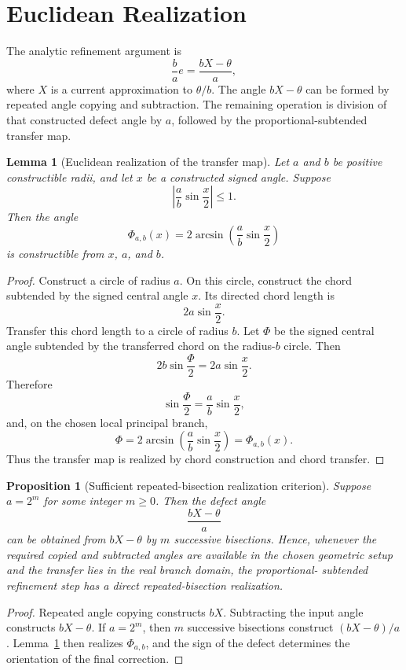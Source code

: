\documentclass[11pt]{article}
\newtheorem{lemma}[theorem]{Lemma}
\newtheorem{proposition}[theorem]{Proposition}
\theoremstyle{definition}
\theoremstyle{remark}
\newcommand{\Phiop}{\Phi}
\begin{document}
\section{Euclidean Realization}
\label{sec:geometry}

The analytic refinement argument is
\[
\frac{b}{a}e
=
\frac{bX-\theta}{a},
\]
where $X$ is a current approximation to $\theta/b$.  The angle $bX-\theta$ can
be formed by repeated angle copying and subtraction.  The remaining operation
is division of that constructed defect angle by $a$, followed by the
proportional-subtended transfer map.

\begin{lemma}[Euclidean realization of the transfer map]
\label{lem:transfer-realization}
Let $a$ and $b$ be positive constructible radii, and let $x$ be a constructed
signed angle.  Suppose
\[
\left|
\frac{a}{b}\sin\frac{x}{2}
\right|
\le 1.
\]
Then the angle
\[
\Phiop_{a,b}(x)
=
2\arcsin\!\left(
\frac{a}{b}\sin\frac{x}{2}
\right)
\]
is constructible from $x$, $a$, and $b$.
\end{lemma}

\begin{proof}
Construct a circle of radius $a$.  On this circle, construct the chord
subtended by the signed central angle $x$.  Its directed chord length is
\[
2a\sin\frac{x}{2}.
\]
Transfer this chord length to a circle of radius $b$.  Let $\Phi$ be the signed
central angle subtended by the transferred chord on the radius-$b$ circle.
Then
\[
2b\sin\frac{\Phi}{2}
=
2a\sin\frac{x}{2}.
\]
Therefore
\[
\sin\frac{\Phi}{2}
=
\frac{a}{b}\sin\frac{x}{2},
\]
and, on the chosen local principal branch,
\[
\Phi
=
2\arcsin\!\left(
\frac{a}{b}\sin\frac{x}{2}
\right)
=
\Phiop_{a,b}(x).
\]
Thus the transfer map is realized by chord construction and chord transfer.
\end{proof}

\begin{proposition}[Sufficient repeated-bisection realization criterion]
\label{prop:bisection-realization}
Suppose $a=2^m$ for some integer $m\ge 0$.  Then the defect angle
\[
\frac{bX-\theta}{a}
\]
can be obtained from $bX-\theta$ by $m$ successive bisections.  Hence, whenever
the required copied and subtracted angles are available in the chosen geometric
setup and the transfer lies in the real branch domain, the proportional-
subtended refinement step has a direct repeated-bisection realization.
\end{proposition}

\begin{proof}
Repeated angle copying constructs $bX$.  Subtracting the input angle constructs
$bX-\theta$.  If $a=2^m$, then $m$ successive bisections construct
$(bX-\theta)/a$.  Lemma~\ref{lem:transfer-realization} then realizes
$\Phiop_{a,b}$, and the sign of the defect determines the orientation of the
final correction.
\end{proof}
\end{document}
